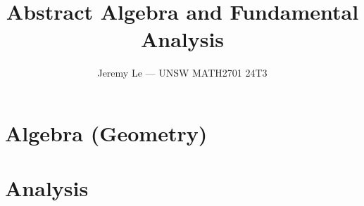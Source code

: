 \documentclass[12pt, letterpaper]{article}
\title{\textbf{Abstract Algebra and Fundamental Analysis}}
\author{Jeremy Le --- UNSW MATH2701 24T3}
\date{}
\theoremstyle{plain}
\theoremstyle{definition}
\begin{document}
\maketitle
\tableofcontents
\newpage

\section{Algebra (Geometry)}


















\section{Analysis}







\end{document}
